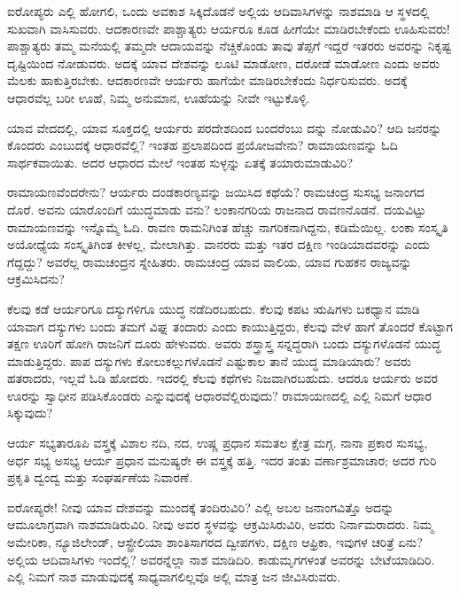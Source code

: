 \eject

ಐರೋಪ್ಯರು ಎಲ್ಲಿ ಹೋಗಲಿ, ಒಂದು ಅವಕಾಶ ಸಿಕ್ಕಿದೊಡನೆ ಅಲ್ಲಿಯ ಆದಿವಾಸಿ\break ಗಳನ್ನು ನಾಶಮಾಡಿ ಆ ಸ್ಥಳದಲ್ಲಿ ಸುಖವಾಗಿ ವಾಸಿಸುವರು. ಆದಕಾರಣವೇ ಪಾಶ್ಚಾತ್ಯರು ಆರ್ಯರೂ ಕೂಡ ಹೀಗೆಯೇ ಮಾಡಿರಬೇಕೆಂದು ಊಹಿಸುವರು! ಪಾಶ್ಚಾತ್ಯರು ತಮ್ಮ ಮನೆಯಲ್ಲಿ ತಮ್ಮದೇ ಆದಾಯವನ್ನು ನೆಚ್ಚಿಕೊಂಡು ತಾವು ತೆಪ್ಪಗೆ ಇದ್ದರೆ ಇತರರು ಅವರನ್ನು ನಿಕೃಷ್ಟ ದೃಷ್ಟಿಯಿಂದ ನೋಡುವರು. ಅದಕ್ಕೆ ಯಾವ ದೇಶವನ್ನು ಲೂಟಿ ಮಾಡೋಣ, ದರೋಡೆ ಮಾಡೋಣ ಎಂದು ಅವರು ಮೆಲಕು ಹಾಕುತ್ತಿರಬೇಕು. ಆದಕಾರಣವೇ ಆರ್ಯರು ಹಾಗೆಯೇ ಮಾಡಿರಬೇಕೆಂದು ನಿರ್ಧರಿಸುವರು. ಅದಕ್ಕೆ ಆಧಾರವೆಲ್ಲ ಬರೀ ಊಹೆ, ನಿಮ್ಮ ಅನುಮಾನ, ಊಹೆಯನ್ನು ನೀವೇ ಇಟ್ಟುಕೊಳ್ಳಿ.

ಯಾವ ವೇದದಲ್ಲಿ, ಯಾವ ಸೂಕ್ತದಲ್ಲಿ ಆರ್ಯರು ಪರದೇಶದಿಂದ ಬಂದರೆಂಬು ದನ್ನು ನೋಡುವಿರಿ? ಆದಿ ಜನರನ್ನು ಕೊಂದರು ಎಂಬುದಕ್ಕೆ ಆಧಾರವೆಲ್ಲಿ? ಇಂತಹ ಪ್ರಲಾಪದಿಂದ ಪ್ರಯೋಜವೇನು? ರಾಮಾಯಣವನ್ನು ಓದಿ ಸಾರ್ಥಕವಾಯಿತು. ಅದರ ಆಧಾರದ ಮೇಲೆ ಇಂತಹ ಸುಳ್ಳನ್ನು ಏತಕ್ಕೆ ತಯಾರುಮಾಡುವಿರಿ?

ರಾಮಾಯಣವೆಂದರೇನು? ಆರ್ಯರು ದಂಡಕಾರಣ್ಯವನ್ನು ಜಯಿಸಿದ ಕಥೆಯೆ? ರಾಮಚಂದ್ರ ಸುಸಭ್ಯ ಜನಾಂಗದ ದೊರೆ. ಅವನು ಯಾರೊಂದಿಗೆ ಯುದ್ಧಮಾಡು ವನು? ಲಂಕಾನಗರಿಯ ರಾಜನಾದ ರಾವಣನೊಡನೆ. ದಯವಿಟ್ಟು ರಾಮಾಯಣವನ್ನು ಇನ್ನೊಮ್ಮೆ ಓದಿ. ರಾವಣ ರಾಮನಿಗಿಂತ ಹೆಚ್ಚು ನಾಗರಿಕನಾಗಿದ್ದನು, ಕಡಿಮೆಯಿಲ್ಲ. ಲಂಕಾ ಸಂಸ್ಕೃತಿ ಅಯೋಧ್ಯೆಯ ಸಂಸ್ಕೃತಿಗಿಂತ ಕೀಳಲ್ಲ, ಮೇಲಾಗಿತ್ತು. ವಾನರರು ಮತ್ತು ಇತರ ದಕ್ಷಿಣ ಇಂಡಿಯಾದವರನ್ನು ಎಂದು ಗೆದ್ದದ್ದು? ಅವರೆಲ್ಲ ರಾಮಚಂದ್ರನ ಸ್ನೇಹಿತರು. ರಾಮಚಂದ್ರ ಯಾವ ವಾಲಿಯ, ಯಾವ ಗುಹಕನ ರಾಜ್ಯವನ್ನು ಆಕ್ರಮಿಸಿದನು?

ಕೆಲವು ಕಡೆ ಆರ್ಯರಿಗೂ ದಸ್ಯುಗಳಿಗೂ ಯುದ್ಧ ನಡೆದಿರಬಹುದು. ಕೆಲವು ಕಪಟ ಋಷಿಗಳು ಬಕಧ್ಯಾನ ಮಾಡಿ ಯಾವಾಗ ದಸ್ಯುಗಳು ಬಂದು ತಮಗೆ ವಿಘ್ನ ತಂದಾರು ಎಂದು ಕಾಯುತ್ತಿದ್ದರು, ಕೆಲವು ವೇಳೆ ಹಾಗೆ ತೊಂದರೆ ಕೊಟ್ಟಾಗ ತಕ್ಷಣ ಊರಿಗೆ ಹೋಗಿ ರಾಜನಿಗೆ ದೂರು ಹೇಳುವರು. ಅವರು ಶಸ್ತ್ರಾಸ್ತ್ರ ಸನ್ನದ್ಧರಾಗಿ ಬಂದು ದಸ್ಯುಗಳೊಡನೆ ಯುದ್ಧ ಮಾಡುತ್ತಿದ್ದರು. ಪಾಪ ದಸ್ಯುಗಳು ಕೋಲುಕಲ್ಲುಗಳೊಡನೆ ಎಷ್ಟುಕಾಲ ತಾನೆ ಯುದ್ಧ ಮಾಡಿಯಾರು? ಅವರು ಹತರಾದರು, ಇಲ್ಲವೆ ಓಡಿ ಹೋದರು. ಇದರಲ್ಲಿ ಕೆಲವು ಕಥೆಗಳು ನಿಜವಾಗಿರಬಹುದು. ಆದರೂ ಆರ್ಯರು ಅವರ ಊರನ್ನು ಸ್ವಾಧೀನ ಪಡಿಸಿಕೊಂಡರು ಎನ್ನುವುದಕ್ಕೆ ಆಧಾರವೆಲ್ಲಿರುವುದು? ರಾಮಾಯಣದಲ್ಲಿ ಎಲ್ಲಿ ನಿಮಗೆ ಆಧಾರ ಸಿಕ್ಕುವುದು?

ಆರ್ಯ ಸಭ್ಯತಾರೂಪಿ ವಸ್ತ್ರಕ್ಕೆ ವಿಶಾಲ ನದಿ, ನದ, ಉಷ್ಣ ಪ್ರಧಾನ ಸಮತಲ ಕ್ಷೇತ್ರ ಮಗ್ಗ. ನಾನಾ ಪ್ರಕಾರ ಸುಸಭ್ಯ, ಅರ್ಧ ಸಭ್ಯ ಅಸಭ್ಯ ಆರ್ಯ ಪ್ರಧಾನ ಮನುಷ್ಯರೇ ಈ ವಸ್ತ್ರಕ್ಕೆ ಹತ್ತಿ. ಇದರ ತಂತು ವರ್ಣಾಶ್ರಮಾಚಾರ; ಅದರ ಗುರಿ ಪ್ರಕೃತಿ ದ್ವಂದ್ವ ಮತ್ತು ಸಂಘರ್ಷಣೆಯ ನಿವಾರಣೆ.

ಐರೋಪ್ಯರೇ! ನೀವು ಯಾವ ದೇಶವನ್ನು ಮುಂದಕ್ಕೆ ತಂದಿರುವಿರಿ? ಎಲ್ಲಿ ಅಬಲ ಜನಾಂಗವಿತ್ತೊ ಅದನ್ನು ಆಮೂಲಾಗ್ರವಾಗಿ ನಾಶಮಾಡಿರುವಿರಿ. ನೀವು ಅವರ ಸ್ಥಳವನ್ನು ಆಕ್ರಮಿಸಿರುವಿರಿ, ಅವರು ನಿರ್ನಾಮರಾದರು. ನಿಮ್ಮ ಅಮೇರಿಕಾ, ನ್ಯೂಜಿಲೇಂಡ್​, ಆಸ್ಟ್ರೇಲಿಯಾ ಶಾಂತಿಸಾಗರದ ದ್ವೀಪಗಳು, ದಕ್ಷಿಣ ಆಫ್ರಿಕಾ, ಇವುಗಳ ಚರಿತ್ರೆ ಏನು? ಅಲ್ಲಿಯ ಆದಿವಾಸಿಗಳು ಇಂದೆಲ್ಲಿ? ಅವರನ್ನೆಲ್ಲಾ ನಾಶ ಮಾಡಿದಿರಿ. ಕಾಡುಮೃಗಗಳಂತೆ ಅವರನ್ನು ಬೇಟೆಯಾಡಿದಿರಿ. ಎಲ್ಲಿ ನಿಮಗೆ ನಾಶ ಮಾಡುವುದಕ್ಕೆ ಸಾಧ್ಯವಾಗಲಿಲ್ಲವೊ ಅಲ್ಲಿ ಮಾತ್ರ ಜನ ಜೀವಿಸಿರುವರು.

\vskip 5pt

